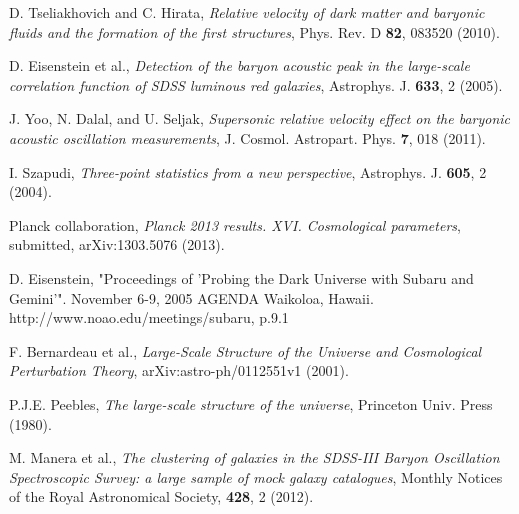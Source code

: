 \documentclass[12pt]{article}
\begin{document}
\begin{thebibliography}{1}

D. Tseliakhovich and C. Hirata, \emph{Relative velocity of dark matter and baryonic fluids and the formation of the first structures}, Phys. Rev. D \textbf{82}, 083520 (2010).

D. Eisenstein et al., \emph{Detection of the baryon acoustic peak in the large-scale correlation function of SDSS luminous red galaxies}, Astrophys. J. \textbf{633}, 2 (2005).

J. Yoo, N. Dalal, and U. Seljak, \emph{Supersonic relative velocity effect on the baryonic acoustic oscillation measurements}, J. Cosmol. Astropart. Phys. \textbf{7}, 018 (2011). 

I. Szapudi, \emph{Three-point statistics from a new perspective}, Astrophys. J. \textbf{605}, 2 (2004).

Planck collaboration, \emph{Planck 2013 results. XVI. Cosmological parameters}, submitted, 	arXiv:1303.5076 (2013).

D. Eisenstein, "Proceedings of 'Probing the Dark Universe with Subaru and Gemini'". November 6-9, 2005 AGENDA Waikoloa, Hawaii. http://www.noao.edu/meetings/subaru, p.9.1

F. Bernardeau et al., \emph{Large-Scale Structure of the Universe and Cosmological Perturbation Theory}, arXiv:astro-ph/0112551v1 (2001).

P.J.E. Peebles, \emph{The large-scale structure of the universe}, Princeton Univ. Press (1980).

M. Manera et al., \emph{The clustering of galaxies in the SDSS-III Baryon Oscillation Spectroscopic Survey: a large sample of mock galaxy catalogues}, Monthly Notices of the Royal Astronomical Society, \textbf{428}, 2 (2012).

\end{thebibliography}
\end{document}
